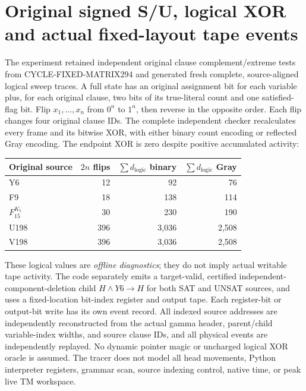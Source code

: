 \documentclass[11pt]{article}
\begin{document}
\section{Original signed S/U, logical XOR and actual fixed-layout tape events}
The experiment retained independent original clause complement/extreme tests from CYCLE-FIXED-MATRIX294 and generated fresh complete, source-aligned logical sweep traces. A full state has an original assignment bit for each variable plus, for each original clause, two bits of its true-literal count and one satisfied-flag bit. Flip $x_1,\ldots,x_n$ from $0^n$ to $1^n$, then reverse in the opposite order. Each flip changes four original clause IDs. The complete independent checker recalculates every frame and its bitwise XOR, with either binary count encoding or reflected Gray encoding. The endpoint XOR is zero despite positive accumulated activity:
\begin{center}\begin{tabular}{lrrr}\toprule
Original source & $2n$ flips & $\sum d_{\mathrm{logic}}$ binary & $\sum d_{\mathrm{logic}}$ Gray\\\midrule
Y6 & 12 & 92 & 76\\
F9 & 18 & 138 & 114\\
$F_{15}^{K_5}$ & 30 & 230 & 190\\
U198 & 396 & 3,036 & 2,508\\
V198 & 396 & 3,036 & 2,508\\\bottomrule
\end{tabular}\end{center}
These logical values are \emph{offline diagnostics}; they do not imply actual writable tape activity. The code separately emits a target-valid, certified independent-component-deletion child $H\wedge Y6\to H$ for both SAT and UNSAT sources, and uses a fixed-location bit-index register and output tape. Each register-bit or output-bit write has its own event record. All indexed source addresses are independently reconstructed from the actual gamma header, parent/child variable-index widths, and source clause IDs, and all physical events are independently replayed. No dynamic pointer magic or uncharged logical XOR oracle is assumed. The tracer does not model all head movements, Python interpreter registers, grammar scan, source indexing control, native time, or peak live TM workspace.
\begin{center}\end{center}
\end{document}
